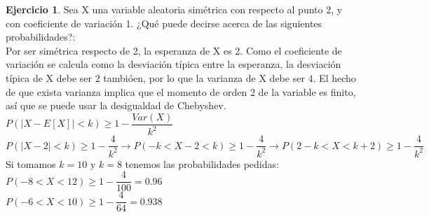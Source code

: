 \documentclass[a4paper, 12pt]{article}
\theoremstyle{definition}
\newtheorem{ej}{Ejercicio}
\begin{document}
\begin{ej}
Sea X una variable aleatoria simétrica con respecto al punto 2, y con coeficiente de variación 1. ¿Qué puede decirse acerca de las siguientes probabilidades?:\\

    Por ser simétrica respecto de 2, la esperanza de X es 2. Como el coeficiente de variación se calcula como la desviación típica entre la esperanza, la desviación típica de X debe ser 2 tambióen, por lo que la varianza de X debe ser 4. El hecho de que exista varianza implica que el momento de orden 2 de la variable es finito, así que se puede usar la desigualdad de Chebyshev.
    \\
    $P(|X-E[X]|<k) \geq 1- \dfrac{Var(X)}{k^2}$\\
    $P(|X-2| < k) \geq 1-\dfrac{4}{k^2} \longrightarrow  P(-k < X - 2 < k) \geq 1 - \dfrac{4}{k^2} \longrightarrow P(2-k < X < k+2) \geq 1-\dfrac{4}{k^2}$ \\
    Si tomamos $k = 10$ y $k = 8$ tenemos las probabilidades pedidas:
    \\
    $P(-8 < X < 12) \geq 1 - \dfrac{4}{100} = 0.96$\\
    $P(-6 < X < 10) \geq 1- \dfrac{4}{64} = 0.938$
\end{ej}
\end{document}
